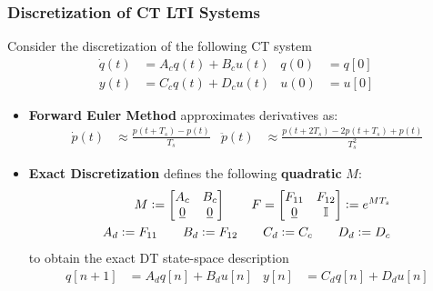\subsubsection{Discretization of CT LTI Systems}
    Consider the discretization of the following CT system
    \begin{align*}
        \dot{q}(t) &= A_c q(t) + B_c u(t) & q(0) &= q[0]\\
        y(t) &= C_c q(t) + D_c u(t) & u(0) &= u[0]
    \end{align*}
    \begin{itemize}
        \item		{\bf Forward Euler Method} approximates derivatives as:
                \begin{align*}
                    \dot{p}(t) &\!\approx\! \frac{p(t\!+\!T_s)\!-\!p(t)}{T_s} & \ddot{p}(t) &\!\approx\! \frac{p(t\!+\!2T_s)\!-\!2p(t\!+\!T_s)\!+\!p(t)}{T_s^2}
                \end{align*}
        \item		{\bf Exact Discretization} defines the following \textbf{quadratic} $M$:
                \begin{align*}
                    M \vcentcolon= 
                        \begin{bmatrix}
                            A_c & B_c \\ \underline{0} & \underline{0}
                        \end{bmatrix} 
                    \qquad F = 
                        \begin{bmatrix} 
                            F_{11} & F_{12} \\ \underline{0} & \mathbb{I}
                        \end{bmatrix} \vcentcolon= e^{MT_s} \\
                    A_d \vcentcolon= F_{11} \qquad B_d \vcentcolon= F_{12} \qquad C_d \vcentcolon= C_c \qquad D_d \vcentcolon= D_c
                \end{align*}
                to obtain the exact DT state-space description
                \begin{align*}
                    q[n+1] &= A_dq[n] + B_du[n] &
                    y[n] &= C_dq[n] + D_du[n]
                \end{align*}
    \end{itemize}



